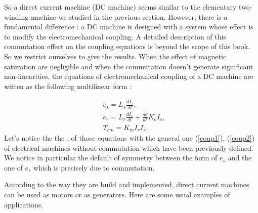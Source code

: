So a direct current machine (DC machine) seems similar to the elementary two-winding machine we studied in the previous section. However, there is a fundamental difference : a DC machine is designed with a 
 system whose effect is to modify the electromechanical coupling. A detailed description of this commutation effect on the coupling equations is beyond the scope of this book.  So we restrict ourselves to give the results. When the effect of magnetic saturation are negligible and when the commutation  
doesn't generate significant non-linearities, the equations  of electromechanical coupling  of a DC machine are witten  as the following multilinear form :
 
\begin{equation*} \begin{split}
&e_s = L_s \frac{dI_s}{dt}, \\[2mm]
&e_r = L_r \frac{dI_r}{dt} + \frac{d\theta}{dt}K_eI_s, \\[2mm]
&T_{em} = K_mI_rI_s.
\end{split} \end{equation*}
Let's notice the the ,
of those equations with the general one (\ref{coup1}), (\ref{coup2}) of electrical machines without commutation which have been previously defined. We notice in particular the default of symmetry between 
the form of $e_s$ and the one of $e_r$ which is precisely  due to commutation. 

According to the way they are build and implemented, direct current machines can be used as motors or as generators.
Here are some usual examples of applications. \\


